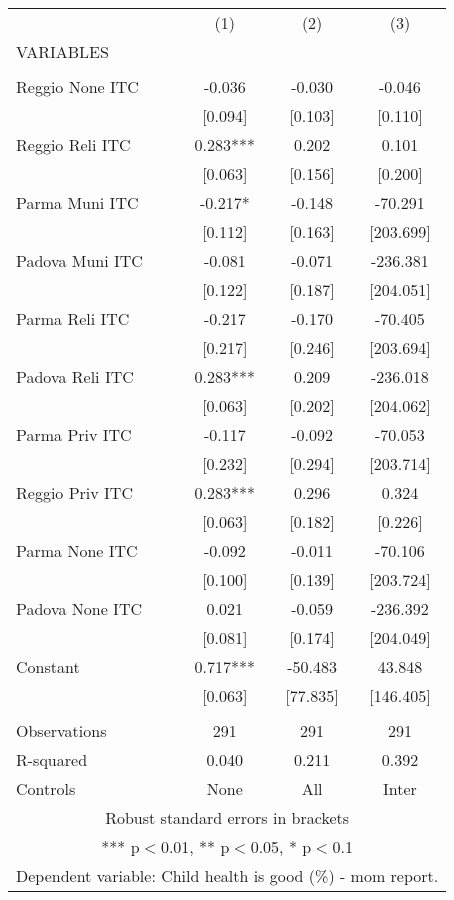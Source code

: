 \begin{tabular}{lccc} \hline
 & (1) & (2) & (3) \\
VARIABLES &  &  &  \\ \hline
 &  &  &  \\
Reggio None ITC & -0.036 & -0.030 & -0.046 \\
 & [0.094] & [0.103] & [0.110] \\
Reggio Reli ITC & 0.283*** & 0.202 & 0.101 \\
 & [0.063] & [0.156] & [0.200] \\
Parma Muni ITC & -0.217* & -0.148 & -70.291 \\
 & [0.112] & [0.163] & [203.699] \\
Padova Muni ITC & -0.081 & -0.071 & -236.381 \\
 & [0.122] & [0.187] & [204.051] \\
Parma Reli ITC & -0.217 & -0.170 & -70.405 \\
 & [0.217] & [0.246] & [203.694] \\
Padova Reli ITC & 0.283*** & 0.209 & -236.018 \\
 & [0.063] & [0.202] & [204.062] \\
Parma Priv ITC & -0.117 & -0.092 & -70.053 \\
 & [0.232] & [0.294] & [203.714] \\
Reggio Priv ITC & 0.283*** & 0.296 & 0.324 \\
 & [0.063] & [0.182] & [0.226] \\
Parma None ITC & -0.092 & -0.011 & -70.106 \\
 & [0.100] & [0.139] & [203.724] \\
Padova None ITC & 0.021 & -0.059 & -236.392 \\
 & [0.081] & [0.174] & [204.049] \\
Constant & 0.717*** & -50.483 & 43.848 \\
 & [0.063] & [77.835] & [146.405] \\
 &  &  &  \\
Observations & 291 & 291 & 291 \\
R-squared & 0.040 & 0.211 & 0.392 \\
 Controls & None & All & Inter \\ \hline
\multicolumn{4}{c}{ Robust standard errors in brackets} \\
\multicolumn{4}{c}{ *** p$<$0.01, ** p$<$0.05, * p$<$0.1} \\
\multicolumn{4}{c}{ Dependent variable: Child health is good (\%) - mom report.} \\
\end{tabular}
